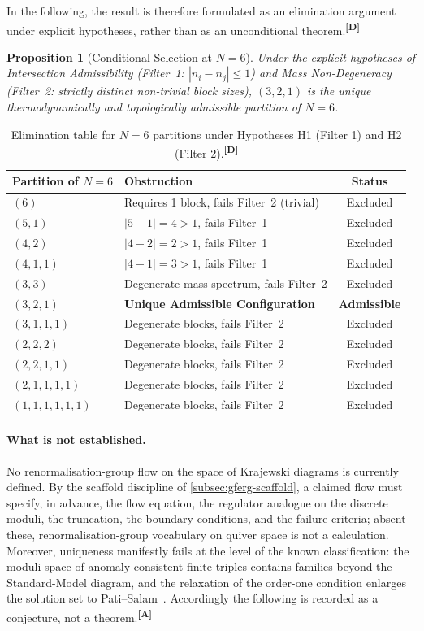 \documentclass[12pt,a4paper,twoside]{article}
\theoremstyle{plain}
\newtheorem{proposition}[theorem]{Proposition}
\theoremstyle{definition}
\theoremstyle{remark}
\newcommand{\catmark}[1]{\textsuperscript{\textsf{\textbf{[#1]}}}}
\begin{document}
In the following, the result is therefore formulated as an elimination argument under explicit hypotheses, rather than as an unconditional theorem.\catmark{D}

\begin{proposition}[Conditional Selection at $N=6$]
Under the explicit hypotheses of Intersection Admissibility (Filter~1: $|n_i - n_j| \le 1$) and Mass Non-Degeneracy (Filter~2: strictly distinct non-trivial block sizes), $(3,2,1)$ is the unique thermodynamically and topologically admissible partition of $N=6$.
\end{proposition}

\begin{table}[h]
\centering
\small
\begin{tabular}{llc}
\toprule
\textbf{Partition of $N=6$} & \textbf{Obstruction} & \textbf{Status} \\
\midrule
$(6)$ & Requires 1 block, fails Filter~2 (trivial) & Excluded \\
$(5,1)$ & $|5-1|=4 > 1$, fails Filter~1 & Excluded \\
$(4,2)$ & $|4-2|=2 > 1$, fails Filter~1 & Excluded \\
$(4,1,1)$ & $|4-1|=3 > 1$, fails Filter~1 & Excluded \\
$(3,3)$ & Degenerate mass spectrum, fails Filter~2 & Excluded \\
$(3,2,1)$ & \textbf{Unique Admissible Configuration} & \textbf{Admissible} \\
$(3,1,1,1)$ & Degenerate blocks, fails Filter~2 & Excluded \\
$(2,2,2)$ & Degenerate blocks, fails Filter~2 & Excluded \\
$(2,2,1,1)$ & Degenerate blocks, fails Filter~2 & Excluded \\
$(2,1,1,1,1)$ & Degenerate blocks, fails Filter~2 & Excluded \\
$(1,1,1,1,1,1)$ & Degenerate blocks, fails Filter~2 & Excluded \\
\bottomrule
\end{tabular}
\caption{Elimination table for $N=6$ partitions under Hypotheses H1 (Filter 1) and H2 (Filter 2).\catmark{D}}
\label{tab:n6_elimination}
\end{table}

\paragraph{What is not established.}
No renormalisation-group flow on the space of Krajewski diagrams is
currently defined. By the scaffold discipline of
\cref{subsec:gferg-scaffold}, a claimed flow must specify, in advance, the
flow equation, the regulator analogue on the discrete moduli, the
truncation, the boundary conditions, and the failure criteria; absent
these, renormalisation-group vocabulary on quiver space is not a
calculation. Moreover, uniqueness manifestly fails at the level of the
known classification: the moduli space of anomaly-consistent finite
triples contains families beyond the Standard-Model diagram, and the
relaxation of the order-one condition enlarges the solution set to
Pati--Salam~\cite{ccvs2013,farnsworth2015}. Accordingly the following is
recorded as a conjecture, not a theorem.\catmark{A}
\end{document}
